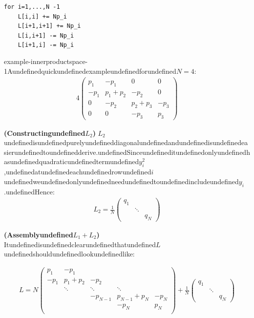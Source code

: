 \begin{mystcodebox}
\begin{verbatim}
for i=1,...,N -1
    L[i,i] += Np_i
    L[i+1,i+1] += Np_i
    L[i,i+1] -= Np_i 
    L[i+1,i] -= Np_i
\end{verbatim}

\end{mystcodebox}
\begin{mystthmexample}{}{example-innerproductspace-1}Aundefinedquickundefinedexampleundefinedforundefined$N=4$:
\begin{equation}
\begin{aligned}
4\begin{pmatrix}
p_1 & -p_1 & 0 & 0 \\
-p_1 & p_1+p_2 & -p_2 &0 \\
0 & -p_2 & p_2+p_3 & -p_3 \\
0 &  0 & -p_3  & p_3
\end{pmatrix}
\end{aligned}
\end{equation}

\end{mystthmexample}
\textbf{(Constructingundefined$L_2$)}
$L_2$undefinedisundefinedpurelyundefineddiagonalundefinedandundefinedisundefinedeasierundefinedtoundefinedderive.undefinedSinceundefineditundefinedonlyundefinedhasundefinedquadraticundefinedtermundefined$y_i^2$,undefinedatundefinedeachundefinedrowundefined$i$undefinedweundefinedonlyundefinedneedundefinedtoundefinedincludeundefined$y_i$.undefinedHence:
\begin{equation}
\begin{aligned}
L_2 = \frac{1}{N}\begin{pmatrix}q_1 & & \\
& \ddots & \\
& & q_N
\end{pmatrix}
\end{aligned}
\end{equation}

\textbf{(Assemblyundefined$L_1+L_2$)}
Itundefinedisundefinedclearundefinedthatundefined$L$undefinedshouldundefinedlookundefinedlike:

\begin{equation}
\begin{aligned}
L=N\begin{pmatrix}
p_1&  -p_1 & & &  \\
-p_1& p_1+p_2 &  -p_2 & &  \\
&  \ddots  &  \ddots &   \ddots &   \\
&  &-p_{N-1} &p_{N-1}+p_{N} & -p_N  \\
& & &-p_N & p_N \\
\end{pmatrix} 
+ 
\frac{1}{N}\begin{pmatrix}q_1 & & \\
& \ddots & \\
& & q_N
\end{pmatrix}
\end{aligned}
\end{equation}


